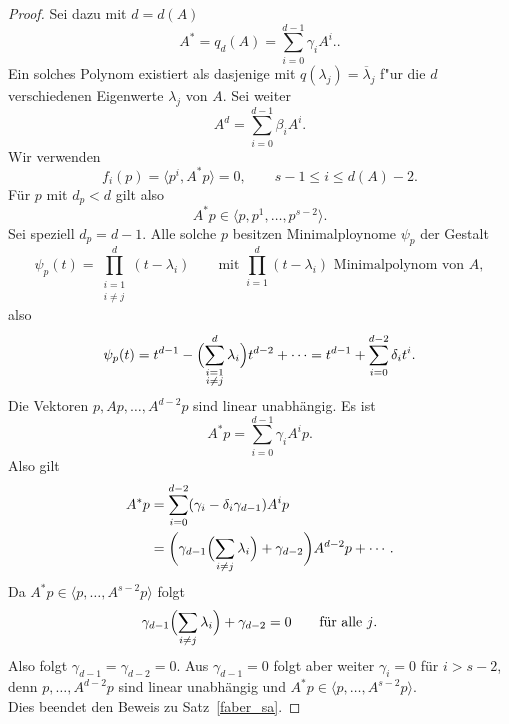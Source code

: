 \begin{proof}
Sei dazu mit $d=d(A)$
\begin{equation*}
  A^*
  =
  q_d(A)
  =
  \sum_{i=0}^{d-1}\gamma_iA^i.
  .
\end{equation*}
Ein solches Polynom existiert als dasjenige mit $q(\lambda_j) = \overline{\lambda}_j$
f"ur die $d$ verschiedenen Eigenwerte $\lambda_j$ von $A$.
Sei weiter
\begin{equation*}
  A^d=\sum_{i=0}^{d-1}\beta_iA^i
  .
\end{equation*}
Wir verwenden
\begin{equation*}
  f_i(p)=
  \langle p^i,A^*p\rangle=0,
  \qquad
  s-1\leq i\leq d(A)-2
  .
\end{equation*}
F\"ur $p$ mit $d_p<d$ gilt also
\begin{equation*}
  A^*p \in \langle p,p^1,\dots,p^{s-2}\rangle
  .
\end{equation*}
Sei speziell $d_p=d-1$. Alle solche $p$ besitzen Minimalploynome $\psi_p$
der Gestalt
\begin{equation*}
  \psi_p(t)
  =
  \prod_{\substack{i=1\\ i\neq j}}^d(t-\lambda_i)
  \qquad
  \text{mit $\prod_{i=1}^d(t-\lambda_i)$ Minimalpolynom von $A$}
  ,
\end{equation*}
also
\begin{equation*}
  \psi_p(t)
  =
  t^{d-1}-\Bigl(\sum_{\substack{i=1\\i\neq j}}^d\lambda_i\Bigr)t^{d-2}
  +\dots
  =
  t^{d-1}+\sum_{i=0}^{d-2}\delta_i t^{i}
  .
\end{equation*}
Die Vektoren $p, Ap, \dots, A^{d-2}p$ sind linear unabh\"angig. Es ist
\begin{equation*}
  A^*p=\sum_{i=0}^{d-1}\gamma_iA^{i}p
  .
\end{equation*}
Also gilt
\begin{align*}
  A^*p
  &=
  \sum_{i=0}^{d-2}(\gamma_i-\delta_i\gamma_{d-1})A^{i}p
  \\
  &=
  \biggl(\gamma_{d-1}\Bigl(\sum_{i\neq j}\lambda_i\Bigr)+\gamma_{d-2}\biggr)
  A^{d-2}p+\dotsb
  .
\end{align*}
Da $A^*p \in \langle p,\dots,A^{s-2}p\rangle$ folgt
\begin{equation*}
  \gamma_{d-1}\Bigl(\sum_{i\neq j}\lambda_i\Bigr)+\gamma_{d-2} = 0
  \qquad
  \text{f\"ur alle $j$}
  .
\end{equation*}
Also folgt $\gamma_{d-1}=\gamma_{d-2}=0$. Aus $\gamma_{d-1}=0$ folgt
aber weiter $\gamma_i=0$ f\"ur $i>s-2$, denn
$p,\dots,A^{d-2}p$ sind linear unabh\"angig und
$A^*p\in\langle p,\dots,A^{s-2}p\rangle$.
\\
Dies beendet den Beweis zu Satz~\ref{faber_sa}.
\end{proof}

